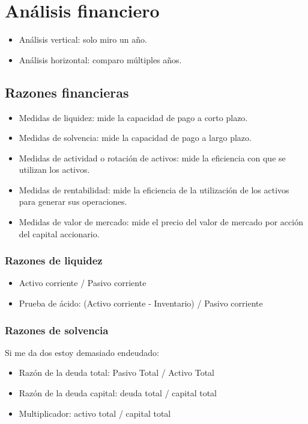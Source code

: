 \section{Análisis financiero}
\begin{itemize}
    \item Análisis vertical: solo miro un año. 
    \item Análisis horizontal: comparo múltiples años. 
\end{itemize}

\subsection{Razones financieras}
\begin{itemize}
    \item Medidas de liquidez: mide la capacidad de pago a corto plazo. 
    \item Medidas de solvencia: mide la capacidad de pago a largo plazo. 
    \item Medidas de actividad o rotación de activos: mide la eficiencia con que se utilizan los activos. 
    \item Medidas de rentabilidad: mide la eficiencia de la utilización de los activos para generar sus operaciones. 
    \item Medidas de valor de mercado: mide el precio del valor de mercado por acción del capital accionario. 
\end{itemize}

\subsubsection{Razones de liquidez}
\begin{itemize}
    \item Activo corriente / Pasivo corriente
    \item Prueba de ácido: (Activo corriente - Inventario) / Pasivo corriente
\end{itemize}

\subsubsection{Razones de solvencia}
Si me da dos estoy demasiado endeudado: 
\begin{itemize}
    \item Razón de la deuda total: Pasivo Total / Activo Total
    \item Razón de la deuda capital: deuda total / capital total 
    \item Multiplicador: activo total / capital total 
\end{itemize}

